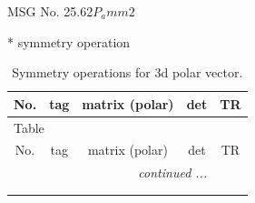 \documentclass[fleqn,8pt]{jsarticle}
\begin{document}
\setcounter{MaxMatrixCols}{32}

\renewcommand{\tablename}{Table~}
\renewcommand{\figurename}{Figure~}
\begin{center}
\LARGE
MSG No. 25.62\quad$P_{a}mm2$
\end{center}
* symmetry operation
\renewcommand{\arraystretch}{1.3}
\begin{longtable}{ccccc}
\caption{Symmetry operations for 3d polar vector.}
 \\
 \hline \hline
No. & tag & matrix (polar) & det & TR \\ \hline \endfirsthead

\multicolumn{4}{l}{\tablename\ \thetable{}} \\
 \hline \hline
No. & tag & matrix (polar) & det & TR \\ \hline \endhead

 \hline \hline
\multicolumn{4}{r}{\footnotesize\it continued ...} \\ \endfoot

 \hline \hline
\multicolumn{4}{r}{} \\ \endlastfoot


\end{longtable}
\end{document}

